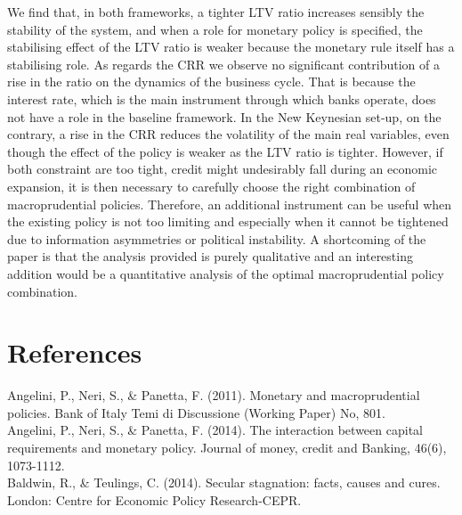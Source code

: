 \documentclass[final,3p,times,twocolumn]{elsarticle}
\begin{document}
We find that, in both frameworks, a tighter LTV ratio increases sensibly the stability of the system, and when a role for monetary policy is specified, the stabilising effect of the LTV ratio is weaker because the monetary rule itself has a stabilising role. As regards the CRR we observe no significant contribution of a rise in the ratio on the dynamics of the business cycle. That is because the interest rate, which is the main instrument through which banks operate, does not have a role in the baseline framework. In the New Keynesian set-up, on the contrary, a rise in the CRR reduces the volatility of the main real variables, even though the effect of the policy is weaker as the LTV ratio is tighter. However, if both constraint are too tight, credit might undesirably fall during an economic expansion, it is then necessary to carefully choose the right combination of macroprudential policies. Therefore, an additional instrument can be useful when the existing policy is not too limiting and especially when it cannot be tightened due to information asymmetries or political instability.
A shortcoming of the paper is that the analysis provided is purely qualitative and an interesting addition would be a quantitative analysis of the optimal macroprudential policy combination. \par




 \section*{References}
 
Angelini, P., Neri, S., \& Panetta, F. (2011). Monetary and macroprudential policies. Bank of Italy Temi di Discussione (Working Paper) No, 801. \\

Angelini, P., Neri, S., \& Panetta, F. (2014). The interaction between capital requirements and monetary policy. Journal of money, credit and Banking, 46(6), 1073-1112. \\

Baldwin, R., \& Teulings, C. (2014). Secular stagnation: facts, causes and cures. London: Centre for Economic Policy Research-CEPR. \\ 
 
\end{document}
